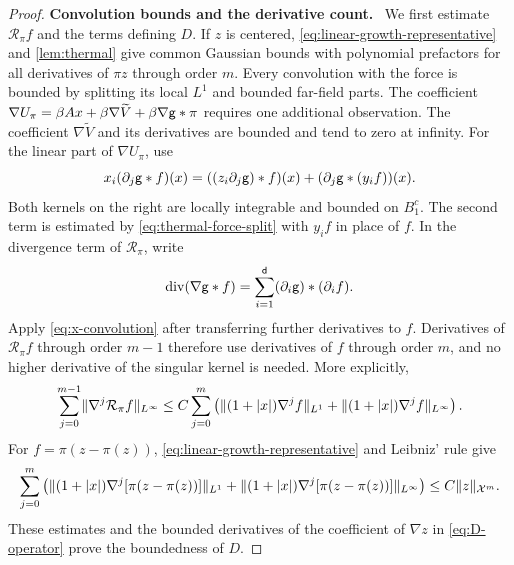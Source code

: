 \documentclass[11pt,reqno]{amsart}
\numberwithin{equation}{section}
\theoremstyle{plain}
\theoremstyle{remark}
\DeclarePairedDelimiter{\norm}{\lVert}{\rVert}
\renewcommand{\d}{\mathsf{d}}\newcommand{\s}{\mathsf{s}}
\DeclareMathOperator{\diver}{div}
\newcommand{\parheading}[1]{\par\medskip\noindent\textbf{#1}\ }
\newcommand{\Xspace}{\mathcal X}
\begin{document}
\begin{proof}
\parheading{Convolution bounds and the derivative count.}
We first estimate $\mathcal R_\pi f$ and the terms defining $D$. If $z$ is centered, \eqref{eq:linear-growth-representative} and \cref{lem:thermal} give common Gaussian bounds with polynomial prefactors for all derivatives of $\pi z$ through order $m$. Every convolution with the force is bounded by splitting its local $L^1$ and bounded far-field parts. The coefficient $\nabla U_\pi=\beta Ax+\beta\nabla\widetilde V+\beta\nabla\mathsf g*\pi$ requires one additional observation. The coefficient $\nabla\widetilde V$ and its derivatives are bounded and tend to zero at infinity. For the linear part of $\nabla U_\pi$, use
\begin{equation}\label{eq:x-convolution}
 x_i(\partial_j\mathsf g*f)(x)=((z_i\partial_j\mathsf g)*f)(x)
                       +(\partial_j\mathsf g*(y_i f))(x).
\end{equation}
Both kernels on the right are locally integrable and bounded on $B_1^c$. The second term is estimated by \eqref{eq:thermal-force-split} with $y_i f$ in place of $f$. In the divergence term of $\mathcal R_\pi$, write
\begin{equation}\label{eq:Rpi-derivative-count}
 \diver(\nabla\g*f)=\sum_{i=1}^{\d}(\partial_i\g)*(\partial_i f).
\end{equation}
Apply \eqref{eq:x-convolution} after transferring further derivatives to $f$. Derivatives of $\mathcal R_\pi f$ through order $m-1$ therefore use derivatives of $f$ through order $m$, and no higher derivative of the singular kernel is needed. More explicitly,
\begin{equation}\label{eq:Rpi-weighted-density-bound}
 \sum_{j=0}^{m-1}\norm{\nabla^j\mathcal R_\pi f}_{L^\infty}
 \le C\sum_{j=0}^m\left(
     \norm{(1+|x|)\nabla^j f}_{L^1}
     +\norm{(1+|x|)\nabla^j f}_{L^\infty}\right).
\end{equation}
For $f=\pi(z-\pi(z))$, \eqref{eq:linear-growth-representative} and Leibniz' rule give
\begin{equation}\label{eq:pi-z-weighted-bound}
 \sum_{j=0}^m\left(
     \norm{(1+|x|)\nabla^j[\pi(z-\pi(z))]}_{L^1}
     +\norm{(1+|x|)\nabla^j[\pi(z-\pi(z))]}_{L^\infty}\right)
 \le C\norm z_{\Xspace^m}.
\end{equation}
These estimates and the bounded derivatives of the coefficient of $\nabla z$ in \eqref{eq:D-operator} prove the boundedness of $D$.


\end{proof}
\end{document}
